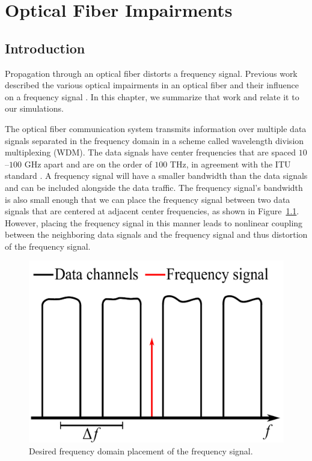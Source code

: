 
\chapter{Optical Fiber Impairments}
\label{chap:fiber_impairments}


\section{Introduction}

Propagation through an optical fiber distorts a frequency signal. Previous work described the various optical impairments in an optical fiber and their influence on a frequency signal \cite{menyukIFCS2015}. In this chapter, we summarize that work and relate it to our simulations.

The optical fiber communication system transmits information over multiple data signals separated in the frequency domain in a scheme called wavelength division multiplexing (WDM). The data signals have center frequencies that are spaced $10$--$100$ GHz apart and are on the order of $100$ THz, in agreement with the ITU standard \cite{ITU-T2012}. A frequency signal will have a smaller bandwidth than the data signals and can be included alongside the data traffic. The frequency signal's bandwidth is also small enough that we can place the frequency signal between two data signals that are centered at adjacent center frequencies, as shown in Figure~\ref{fig:system}. However, placing the frequency signal in this manner leads to nonlinear coupling between the neighboring data signals and the frequency signal and thus distortion of the frequency signal.

\begin{figure}
	\raggedright
	\includegraphics[scale=0.6]{img/system.pdf}
	\renewcommand{\baselinestretch}{1}
	\small\normalsize
	\caption{Desired frequency domain placement of the frequency signal.	\label{fig:system}}
\end{figure}
\renewcommand{\baselinestretch}{2}
\small\normalsize

